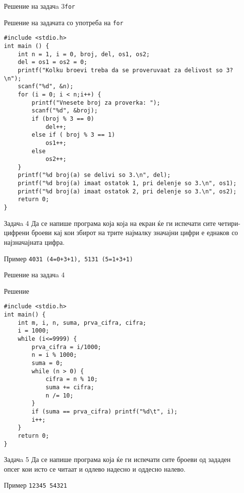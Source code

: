 \begin{frame}[fragile]{Решение на задачa 3}{\texttt{for}}
\begin{exampleblock}{Решение на задачата со употреба на \texttt{for}}
\begin{lstlisting}
#include <stdio.h> 
int main () { 
    int n = 1, i = 0, broj, del, os1, os2; 
    del = os1 = os2 = 0; 
    printf("Kolku broevi treba da se proveruvaat za delivost so 3?\n"); 
    scanf("%d", &n); 
    for (i = 0; i < n;i++) { 
        printf("Vnesete broj za proverka: "); 
        scanf("%d", &broj); 
        if (broj % 3 == 0) 
            del++; 
        else if ( broj % 3 == 1) 
            os1++; 
        else 
            os2++; 
    }
    printf("%d broj(a) se delivi so 3.\n", del); 
    printf("%d broj(a) imaat ostatok 1, pri delenje so 3.\n", os1); 
    printf("%d broj(a) imaat ostatok 2, pri delenje so 3.\n", os2); 
    return 0; 
}
\end{lstlisting}
\end{exampleblock}
\end{frame}

\begin{frame}[fragile]{Задачa 4}
Да се напише програма која која на екран ќе ги испечати сите четири-цифрени броеви кај кои збирот на трите 
најмалку значајни цифри е еднаков со најзначајната цифра.
\begin{exampleblock}{Пример}
    \texttt{4031 (4=0+3+1), 5131 (5=1+3+1)}
\end{exampleblock}
\end{frame}

\begin{frame}[fragile]{Решение на задачa 4}
\begin{exampleblock}{Решение}
    \begin{lstlisting}
#include <stdio.h> 
int main() { 
    int m, i, n, suma, prva_cifra, cifra; 
    i = 1000; 
    while (i<=9999) { 
        prva_cifra = i/1000; 
        n = i % 1000; 
        suma = 0; 
        while (n > 0) { 
            cifra = n % 10; 
            suma += cifra; 
            n /= 10; 
        } 
        if (suma == prva_cifra) printf("%d\t", i); 
        i++; 
    } 
    return 0; 
}
    \end{lstlisting}
\end{exampleblock}
\end{frame}

\begin{frame}[fragile]{Задачa 5}
Да се напише програма која ќе ги испечати сите броеви од зададен опсег кои исто
се читаат и одлево надесно и оддесно налево.
\begin{exampleblock}{Пример}
\texttt{12345    54321}
\end{exampleblock}
\end{frame}

